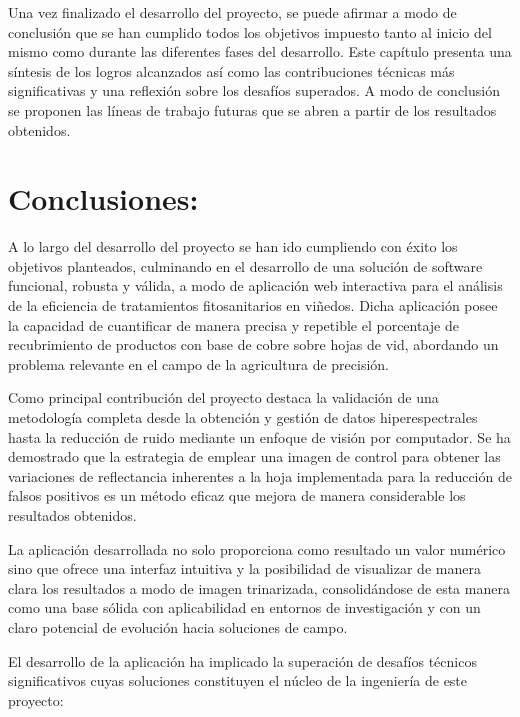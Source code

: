 
Una vez finalizado el desarrollo del proyecto, se puede afirmar  a modo de conclusión que se han cumplido todos los objetivos impuesto tanto al inicio del mismo como durante las diferentes fases del desarrollo. Este capítulo presenta una síntesis de los logros alcanzados así como las contribuciones técnicas más significativas y una reflexión sobre los desafíos superados. A modo de conclusión se proponen las líneas de trabajo futuras que se abren a partir de los resultados obtenidos. 

\section{Conclusiones:}
A lo largo del desarrollo del proyecto se han ido cumpliendo con éxito los objetivos planteados, culminando en el desarrollo de una solución de software funcional, robusta y válida, a modo de aplicación web interactiva para el análisis de la eficiencia de tratamientos fitosanitarios en viñedos. Dicha aplicación posee la capacidad de cuantificar de manera precisa y repetible el porcentaje de recubrimiento de productos con base de cobre sobre hojas de vid, abordando un problema relevante en el campo de la agricultura de precisión.

Como principal contribución del proyecto destaca la validación de una metodología completa desde la obtención y gestión de datos hiperespectrales hasta la reducción de ruido mediante un enfoque de visión por computador. Se ha demostrado que la estrategia de emplear una imagen de control para obtener las variaciones de reflectancia inherentes a la hoja  implementada para la reducción de falsos positivos es un método eficaz que mejora de manera considerable los resultados obtenidos.

La aplicación desarrollada no solo proporciona como resultado un valor numérico sino que ofrece una interfaz intuitiva y la posibilidad de visualizar de manera clara los resultados a modo de imagen trinarizada, consolidándose de esta manera como una base sólida con aplicabilidad en entornos de  investigación y con un claro potencial de evolución hacia soluciones de campo.

El desarrollo de la aplicación ha implicado la superación de desafíos técnicos significativos cuyas soluciones constituyen el núcleo de la ingeniería de este proyecto:


